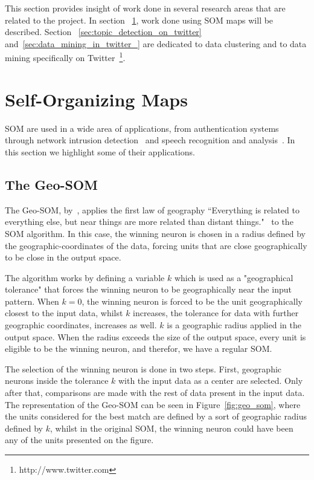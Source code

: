 This section provides insight of work done in several research areas that are related to the project. In section ~\ref{sec:self_organizing_maps}, work done using \ac{SOM} maps will be described. Section ~\ref{sec:topic_detection_on_twitter} and~\ref{sec:data_mining_in_twitter_} are dedicated to data clustering and to data mining specifically on Twitter~\footnote{http://www.twitter.com}.

\section{Self-Organizing Maps} 
\label{sec:self_organizing_maps}
\ac{SOM} are used in a wide area of applications, from authentication systems~\cite{Dozono2012} through network intrusion detection~\cite{intrusion_som} and speech recognition and analysis~\cite{phonetic_typewiter}. In this section we highlight some of their applications.

\subsection{The Geo-SOM} 
\label{sub:types_of_soms}
The Geo-SOM, by~\citet{Bacao2005}, applies the first law of geography “Everything is related to everything else, but near things are more related than distant things."~\cite{citeulike:612692} to the \ac{SOM} algorithm. In this case, the winning neuron is chosen in a radius defined by the geographic-coordinates of the data, forcing units that are close geographically to be close in the output space.

The algorithm works by defining a variable $k$ which is used as a "geographical tolerance" that forces the winning neuron to be geographically near the input pattern. When $k=0$, the winning neuron is forced to be the unit geographically closest to the input data, whilst $k$ increases, the tolerance for data with further geographic coordinates, increases as well. $k$ is a geographic radius applied in the output space. When the radius exceeds the size of the output space, every unit is eligible to be the winning neuron, and therefor, we have a regular \ac{SOM}.

The selection of the winning neuron is done in two steps. First, geographic neurons inside the tolerance $k$ with the input data as a center are selected. Only after that, comparisons are made with the rest of data present in the input data. The representation of the Geo-SOM can be seen in Figure~\ref{fig:geo_som}, where the units considered for the best match are defined by a sort of geographic radius defined by $k$, whilst in the original \ac{SOM}, the winning neuron could have been any of the units presented on the figure.

